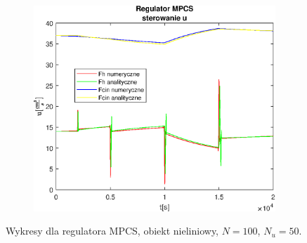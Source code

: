 \begin{figure}[h!]
   \begin{subfigure}[b]{0.4\textwidth}
      \includegraphics[width=1\linewidth]{img/MPCSnumRK/MPCSRKControlN100Nu50l50.eps}
      \caption{}
      \label{fig:fig:MPCSRKN100Nu50l503}
   \end{subfigure}
       
   \caption{Wykresy dla regulatora MPCS, obiekt nieliniowy, $N = 100$, $N_u = 50$.}
   \label{fig:MPCSRKN100Nu50l50}
\end{figure}
           
